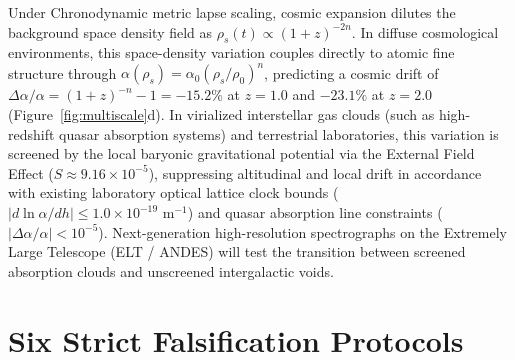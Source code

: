 \documentclass[aps,prd,reprint,superscriptaddress,nofootinbib,twocolumn,floatfix]{revtex4-2}
\begin{document}
Under Chronodynamic metric lapse scaling, cosmic expansion dilutes the background space density field as $\rho_s(t) \propto (1+z)^{-2n}$. In diffuse cosmological environments, this space-density variation couples directly to atomic fine structure through $\alpha(\rho_s) = \alpha_0 (\rho_s / \rho_0)^n$, predicting a cosmic drift of $\Delta\alpha/\alpha = (1+z)^{-n} - 1 = -15.2\%$ at $z = 1.0$ and $-23.1\%$ at $z = 2.0$ (Figure~\ref{fig:multiscale}d). In virialized interstellar gas clouds (such as high-redshift quasar absorption systems) and terrestrial laboratories, this variation is screened by the local baryonic gravitational potential via the External Field Effect ($S \approx 9.16 \times 10^{-5}$), suppressing altitudinal and local drift in accordance with existing laboratory optical lattice clock bounds ($|d\ln\alpha/dh| \le 1.0 \times 10^{-19}\text{ m}^{-1}$) and quasar absorption line constraints ($|\Delta\alpha/\alpha| < 10^{-5}$). Next-generation high-resolution spectrographs on the Extremely Large Telescope (ELT / ANDES) will test the transition between screened absorption clouds and unscreened intergalactic voids.

\section{Six Strict Falsification Protocols}
\label{sec:falsification}
\end{document}

